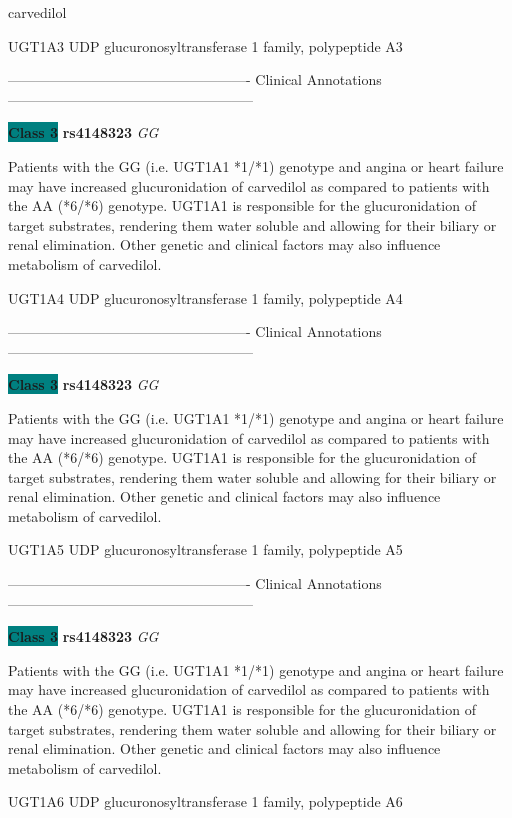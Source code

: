 \documentclass{resume} %
\begin{document}
\begin{rSection}{ carvedilol }
\begin{rSubsection}{ UGT1A3 }{ UDP glucuronosyltransferase 1 family, polypeptide A3 }{}{}
\item[] ---------------------------------------------------- Clinical Annotations -----------------------------------------------------\newline
\item \textbf{\colorbox{teal} {Class 3}} \textbf{ rs4148323 } \textit{ GG }
\item[] Patients with the GG (i.e. UGT1A1 *1/*1) genotype and angina or heart failure may have increased glucuronidation of carvedilol as compared to patients with the AA (*6/*6) genotype. UGT1A1 is responsible for the glucuronidation of target substrates, rendering them water soluble and allowing for their biliary or renal elimination. Other genetic and clinical factors may also influence metabolism of carvedilol.
\end{rSubsection}\begin{rSubsection}{ UGT1A4 }{ UDP glucuronosyltransferase 1 family, polypeptide A4 }{}{}
\item[]

\item[] ---------------------------------------------------- Clinical Annotations -----------------------------------------------------\newline
\item \textbf{\colorbox{teal} {Class 3}} \textbf{ rs4148323 } \textit{ GG }
\item[] Patients with the GG (i.e. UGT1A1 *1/*1) genotype and angina or heart failure may have increased glucuronidation of carvedilol as compared to patients with the AA (*6/*6) genotype. UGT1A1 is responsible for the glucuronidation of target substrates, rendering them water soluble and allowing for their biliary or renal elimination. Other genetic and clinical factors may also influence metabolism of carvedilol.
\end{rSubsection}\begin{rSubsection}{ UGT1A5 }{ UDP glucuronosyltransferase 1 family, polypeptide A5 }{}{}
\item[]

\item[] ---------------------------------------------------- Clinical Annotations -----------------------------------------------------\newline
\item \textbf{\colorbox{teal} {Class 3}} \textbf{ rs4148323 } \textit{ GG }
\item[] Patients with the GG (i.e. UGT1A1 *1/*1) genotype and angina or heart failure may have increased glucuronidation of carvedilol as compared to patients with the AA (*6/*6) genotype. UGT1A1 is responsible for the glucuronidation of target substrates, rendering them water soluble and allowing for their biliary or renal elimination. Other genetic and clinical factors may also influence metabolism of carvedilol.
\end{rSubsection}\begin{rSubsection}{ UGT1A6 }{ UDP glucuronosyltransferase 1 family, polypeptide A6 }{}{}
\item[]


\end{rSubsection}
\end{rSection}
\end{document}
